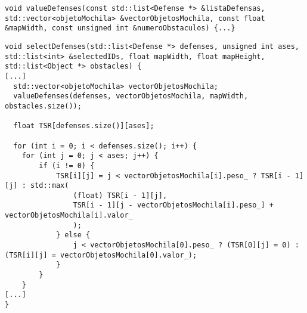 \begin{lstlisting}
void valueDefenses(const std::list<Defense *> &listaDefensas, std::vector<objetoMochila> &vectorObjetosMochila, const float &mapWidth, const unsigned int &numeroObstaculos) {...}
\end{lstlisting}

\begin{lstlisting}
void selectDefenses(std::list<Defense *> defenses, unsigned int ases, std::list<int> &selectedIDs, float mapWidth, float mapHeight, std::list<Object *> obstacles) {
[...]
  std::vector<objetoMochila> vectorObjetosMochila;
  valueDefenses(defenses, vectorObjetosMochila, mapWidth, obstacles.size());

  float TSR[defenses.size()][ases];

  for (int i = 0; i < defenses.size(); i++) {
    for (int j = 0; j < ases; j++) {
        if (i != 0) {
            TSR[i][j] = j < vectorObjetosMochila[i].peso_ ? TSR[i - 1][j] : std::max(
                (float) TSR[i - 1][j],
                TSR[i - 1][j - vectorObjetosMochila[i].peso_] + vectorObjetosMochila[i].valor_
                );
            } else {
                j < vectorObjetosMochila[0].peso_ ? (TSR[0][j] = 0) : (TSR[i][j] = vectorObjetosMochila[0].valor_);
            }
        }
    }
[...]
}
\end{lstlisting}